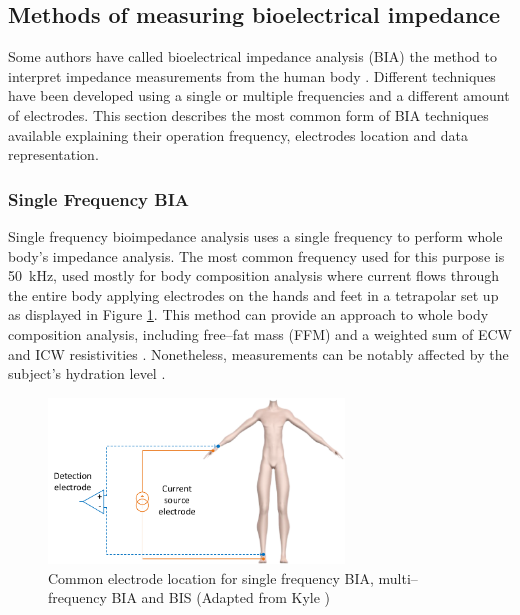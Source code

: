 \subsection{Methods of measuring bioelectrical impedance}
\label{section impedance state art.1}
Some authors have called bioelectrical impedance analysis (BIA) the method to interpret impedance measurements from the human body \cite{kyle2004bioelectrical}. Different techniques have been developed using a single or multiple frequencies and a different amount of electrodes. This section describes the most common form of BIA techniques available explaining their operation frequency, electrodes location and data representation.

\subsubsection{Single Frequency BIA}
Single frequency bioimpedance analysis uses a single frequency to perform whole body’s impedance analysis. The most common frequency used for this purpose is \SI{50}{\kilo\hertz}, used mostly for body composition analysis where current flows through the entire body applying electrodes on the hands and feet in a tetrapolar set up as displayed in Figure \ref{fig:single f BIA}. This method can provide an approach to whole body composition analysis, including free–fat mass (FFM) and a weighted sum of ECW and ICW resistivities \cite{kyle2004bioelectrical}. Nonetheless, measurements can be notably affected by the subject’s hydration level \cite{gudivaka1999single,schoeller2000bioelectrical}.

\begin{figure}[!htpb]
	\centering
	\includegraphics[width=0.7\textwidth,keepaspectratio]{figure12}    
	\caption[Common electrodes placement for whole body BIA and BIS]{Common electrode location for single frequency BIA, multi–frequency BIA and BIS (Adapted from Kyle \cite{kyle2004bioelectrical})}
	\label{fig:single f BIA}
\end{figure}

